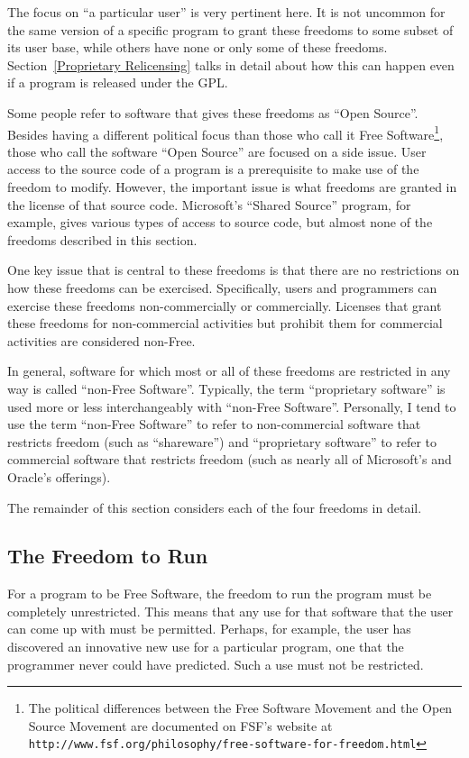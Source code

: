 \documentclass[12pt]{report}
\begin{document}
The focus on ``a particular user'' is very pertinent here.  It is not
uncommon for the same version of a specific program to grant these
freedoms to some subset of its user base, while others have none or only
some of these freedoms.  Section~\ref{Proprietary Relicensing} talks in
detail about how this can happen even if a program is released under the
GPL\@.

Some people refer to software that gives these freedoms as ``Open
Source''.  Besides having a different political focus than those who call
it Free Software\footnote{The political differences between the Free
Software Movement and the Open Source Movement are documented on FSF's
website at
{\tt http://www.fsf.org/philosophy/free-software-for-freedom.html}},
those who call the software ``Open Source'' are focused on a side issue.
User access to the source code of a program is a prerequisite to make use
of the freedom to modify.  However, the important issue is what freedoms
are granted in the license of that source code.  Microsoft's ``Shared
Source'' program, for example, gives various types of access to source
code, but almost none of the freedoms described in this section.

One key issue that is central to these freedoms is that there are no
restrictions on how these freedoms can be exercised.  Specifically, users
and programmers can exercise these freedoms non-commercially or
commercially.  Licenses that grant these freedoms for non-commercial
activities but prohibit them for commercial activities are considered
non-Free.

In general, software for which most or all of these freedoms are
restricted in any way is called ``non-Free Software''.  Typically, the
term ``proprietary software'' is used more or less interchangeably with
``non-Free Software''.  Personally, I tend to use the term ``non-Free
Software'' to refer to non-commercial software that restricts freedom
(such as ``shareware'') and ``proprietary software'' to refer to
commercial software that restricts freedom (such as nearly all of
Microsoft's and Oracle's offerings).

The remainder of this section considers each of the four freedoms in
detail.

\subsection{The Freedom to Run}

For a program to be Free Software, the freedom to run the program must be
completely unrestricted.  This means that any use for that software that
the user can come up with must be permitted.  Perhaps, for example, the
user has discovered an innovative new use for a particular program, one
that the programmer never could have predicted.  Such a use must not be
restricted.
\end{document}
